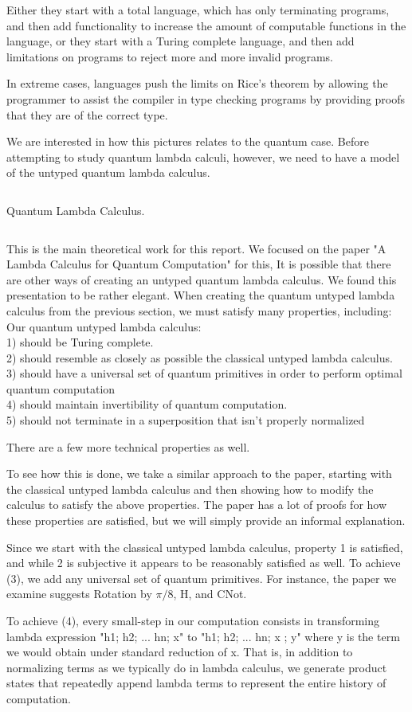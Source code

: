 \documentclass{article}
\theoremstyle{plain}
\theoremstyle{definition}
\theoremstyle{remark}
\begin{document}
Either they start with a total language, which has only terminating programs, and then add functionality to increase the amount of computable functions in the language, or they start with a Turing complete language, and then add limitations on programs to reject more and more invalid programs.

In extreme cases, languages push the limits on Rice's theorem by allowing the programmer to assist the compiler in type checking programs by providing proofs that they are of the correct type.


We are interested in how this pictures relates to the quantum case.
Before attempting to study quantum lambda calculi, however, we need to have a model of the untyped quantum lambda calculus.

$$$$

Quantum Lambda Calculus.

$$$$

This is the main theoretical work for this report.
We focused on the paper "A Lambda Calculus for Quantum Computation" for this,
It is possible that there are other ways of creating an untyped quantum lambda calculus.
We found this presentation to be rather elegant.
When creating the quantum untyped lambda calculus from the previous section, we must satisfy many properties, including: 
$$$$
Our quantum untyped lambda calculus:
$$$$
1) should be Turing complete.$$$$
2) should resemble as closely as possible the classical untyped lambda calculus.$$$$
3) should have a universal set of quantum primitives in order to perform optimal quantum computation$$$$
4) should maintain invertibility of quantum computation.$$$$
5) should not terminate in a superposition that isn't properly normalized$$$$
$$$$

There are a few more technical properties as well.


To see how this is done, we take a similar approach to the paper, starting with the classical untyped lambda calculus and then showing how to modify the calculus to satisfy the above properties.
The paper has a lot of proofs for how these properties are satisfied, but we will simply provide an informal explanation.


Since we start with the classical untyped lambda calculus, property 1 is satisfied, and while 2 is subjective it appears to be reasonably satisfied as well.
To achieve (3), we add any universal set of quantum primitives. For instance, the paper we examine suggests Rotation by $\pi/8$, H, and CNot.

To achieve (4), every small-step in our computation consists in
transforming lambda expression "h1; h2; ... hn; x" to "h1; h2; ... hn; x ; y" where y is the term we would obtain under standard reduction of x.
That is, in addition to normalizing terms as we typically do in lambda calculus, we generate product states that repeatedly append lambda terms to represent the entire history of computation.
\end{document}
